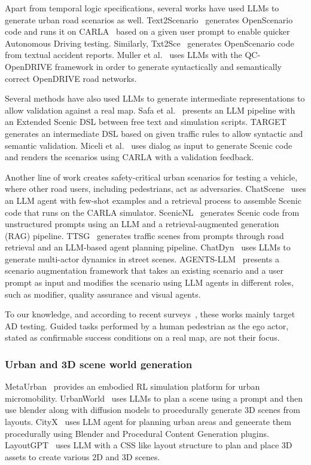 \documentclass[preprint,12pt]{elsarticle}
\begin{document}
Apart from temporal logic specifications, several works have used LLMs to generate urban road scenarios as well. Text2Scenario~\cite{todo cite text2scenario} generates OpenScenario code and runs it on CARLA~\cite{todo cite carla} based on a given user prompt to enable quicker Autonomous Driving testing. Similarly, Txt2Sce~\cite{txt2sce2025} generates OpenScenario code from textual accident reports. Muller et al.~\cite{muller2025qcopendrive} uses LLMs with the QC-OpenDRIVE framework in order to generate syntactically and semantically correct OpenDRIVE road networks. 

Several methods have also used LLMs to generate intermediate representations to allow validation against a real map. Safa et al.~\cite{safa2026extendedscenic} presents an LLM pipeline with an Extended Scenic DSL between free text and simulation scripts. TARGET~\cite{target2023} generates an intermediate DSL based on given traffic rules to allow  syntactic and semantic validation. Miceli et al.~\cite{miceli2023dialogue} uses dialog as input to generate Scenic code and renders the scenarios using CARLA with a validation feedback.

Another line of work creates safety-critical urban scenarios for testing a vehicle, where other road users, including pedestrians, act as adversaries. ChatScene~\cite{zhang2024chatscene} uses an LLM agent with few-shot examples and a retrieval process to assemble Scenic code that runs on the CARLA simulator. ScenicNL~\cite{elmaaroufi2024scenicnl} generates Scenic code from unstructured prompts using an LLM and a retrieval-augmented generation (RAG) pipeline. TTSG~\cite{ruan2024ttsg} generates traffic scenes from prompts through road retrieval and an LLM-based agent planning pipeline. ChatDyn~\cite{chatdyn2024} uses LLMs to generate multi-actor dynamics in street scenes. AGENTS-LLM~\cite{yao2025agentsllm} presents a scenario augmentation framework that takes an existing scenario and a user prompt as input and modifies the scenario using LLM agents in different roles, such as modifier, quality assurance and visual agents.

To our knowledge, and according to recent surveys~\cite{zhao2025llmsurvey, zhou2025genaisurvey}, these works mainly target AD testing. Guided tasks performed by a human pedestrian as the ego actor, stated as confirmable success conditions on a real map, are not their focus.


\subsubsection{Urban and 3D scene world generation}
MetaUrban~\cite{wu2025metaurban} provides an embodied RL simulation platform for urban micromobility. UrbanWorld~\cite{shang2024urbanworld} uses LLMs to plan a scene using a prompt and then use blender along with diffusion models to procedurally generate 3D scenes from layouts. CityX~\cite{zhang2024cityx} uses LLM agent for planning urban areas and geneerate them procedurally using Blender and Procedural Content Generation plugins. LayoutGPT~\cite{feng2023layoutgpt} uses LLM with a CSS like layout structure to plan and place 3D assets to create various 2D and 3D scenes.
\end{document}

